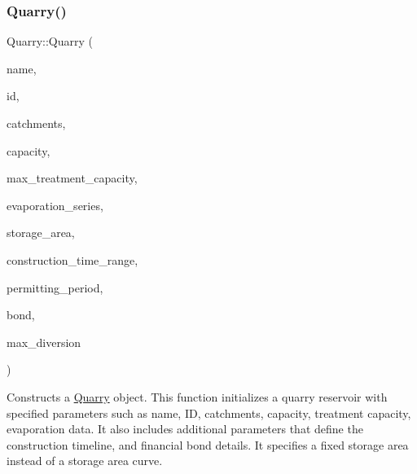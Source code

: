 \subsubsection{\texorpdfstring{Quarry()}{Quarry()}\hspace{0.1cm}{\footnotesize\ttfamily [4/5]}}
{\footnotesize\ttfamily Quarry\+::\+Quarry (\begin{DoxyParamCaption}\item[{const char $\ast$}]{name,  }\item[{const int}]{id,  }\item[{const vector$<$ \mbox{\hyperlink{classCatchment}{Catchment}} $\ast$$>$ \&}]{catchments,  }\item[{const double}]{capacity,  }\item[{const double}]{max\+\_\+treatment\+\_\+capacity,  }\item[{\mbox{\hyperlink{classEvaporationSeries}{Evaporation\+Series}} \&}]{evaporation\+\_\+series,  }\item[{double}]{storage\+\_\+area,  }\item[{const vector$<$ double $>$ \&}]{construction\+\_\+time\+\_\+range,  }\item[{double}]{permitting\+\_\+period,  }\item[{\mbox{\hyperlink{classBond}{Bond}} \&}]{bond,  }\item[{double}]{max\+\_\+diversion }\end{DoxyParamCaption})}



Constructs a \mbox{\hyperlink{classQuarry}{Quarry}} object. This function initializes a quarry reservoir with specified parameters such as name, ID, catchments, capacity, treatment capacity, evaporation data. It also includes additional parameters that define the construction timeline, and financial bond details. It specifies a fixed storage area instead of a storage area curve. 


